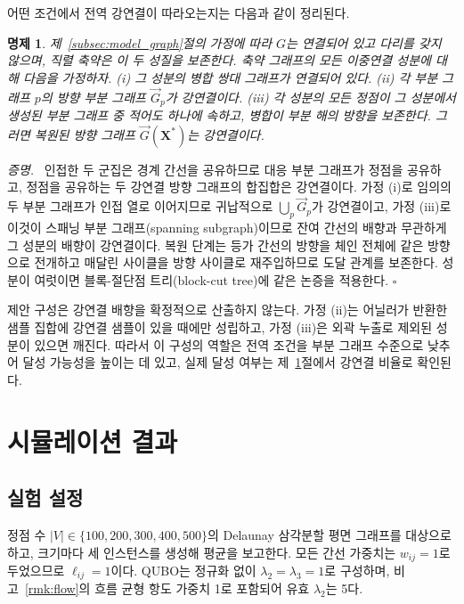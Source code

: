 \documentclass[twocolumn,a4paper]{article}
\newtheorem{proposition}[theorem]{명제}
\newenvironment{proof}{\par\noindent\textit{증명.}\ }{\hfill\(\square\)\par\medskip}
\begin{document}
어떤 조건에서 전역 강연결이 따라오는지는 다음과 같이 정리된다.

\begin{proposition} \label{prop:sc}
제~\ref{subsec:model_graph}절의 가정에 따라 \(G\)는 연결되어 있고 다리를 갖지 않으며, 직렬 축약은 이 두 성질을 보존한다. 축약 그래프의 모든 이중연결 성분에 대해 다음을 가정하자. (i) 그 성분의 병합 쌍대 그래프가 연결되어 있다. (ii) 각 부분 그래프 \(p\)의 방향 부분 그래프 \(\vec{G}_p\)가 강연결이다. (iii) 각 성분의 모든 정점이 그 성분에서 생성된 부분 그래프 중 적어도 하나에 속하고, 병합이 부분 해의 방향을 보존한다. 그러면 복원된 방향 그래프 \(\vec{G}(\mathbf{X}^{*})\)는 강연결이다.
\end{proposition}

\begin{proof}
인접한 두 군집은 경계 간선을 공유하므로 대응 부분 그래프가 정점을 공유하고, 정점을 공유하는 두 강연결 방향 그래프의 합집합은 강연결이다. 가정 (i)로 임의의 두 부분 그래프가 인접 열로 이어지므로 귀납적으로 \(\bigcup_p\vec{G}_p\)가 강연결이고, 가정 (iii)로 이것이 스패닝 부분 그래프(spanning subgraph)이므로 잔여 간선의 배향과 무관하게 그 성분의 배향이 강연결이다. 복원 단계는 등가 간선의 방향을 체인 전체에 같은 방향으로 전개하고 매달린 사이클을 방향 사이클로 재주입하므로 도달 관계를 보존한다. 성분이 여럿이면 블록-절단점 트리(block-cut tree)에 같은 논증을 적용한다.
\end{proof}

제안 구성은 강연결 배향을 확정적으로 산출하지 않는다. 가정 (ii)는 어닐러가 반환한 샘플 집합에 강연결 샘플이 있을 때에만 성립하고, 가정 (iii)은 외곽 누출로 제외된 성분이 있으면 깨진다. 따라서 이 구성의 역할은 전역 조건을 부분 그래프 수준으로 낮추어 달성 가능성을 높이는 데 있고, 실제 달성 여부는 제~\ref{sec:result}절에서 강연결 비율로 확인된다.

\section{시뮬레이션 결과} \label{sec:result}

\subsection{실험 설정}

정점 수 \(|V|\in\{100,200,300,400,500\}\)의 Delaunay 삼각분할 평면 그래프를 대상으로 하고, 크기마다 세 인스턴스를 생성해 평균을 보고한다. 모든 간선 가중치는 \(w_{ij}=1\)로 두었으므로 \(\ell_{ij}=1\)이다. QUBO는 정규화 없이 \(\lambda_2=\lambda_3=1\)로 구성하며, 비고~\ref{rmk:flow}의 흐름 균형 항도 가중치 1로 포함되어 유효 \(\lambda_2\)는 5다.
\end{document}
